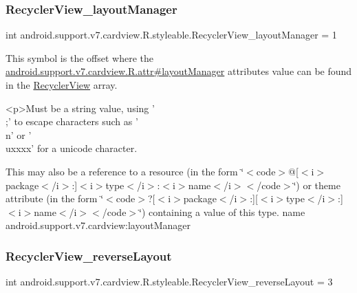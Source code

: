 \subsubsection{\texorpdfstring{Recycler\+View\+\_\+layout\+Manager}{RecyclerView\_layoutManager}}
{\footnotesize\ttfamily int android.\+support.\+v7.\+cardview.\+R.\+styleable.\+Recycler\+View\+\_\+layout\+Manager = 1\hspace{0.3cm}{\ttfamily [static]}}

This symbol is the offset where the \hyperlink{classandroid_1_1support_1_1v7_1_1cardview_1_1R_1_1attr_a7c0556c8a91bf157017e4ec44e5126ab}{android.\+support.\+v7.\+cardview.\+R.\+attr\#layout\+Manager} attribute\textquotesingle{}s value can be found in the \hyperlink{classandroid_1_1support_1_1v7_1_1cardview_1_1R_1_1styleable_a65f321ce206d51d7c6ea76d7ea7bbb05}{Recycler\+View} array.

\begin{DoxyVerb}      <p>Must be a string value, using '\\;' to escape characters such as '\\n' or '\\uxxxx' for a unicode character.
\end{DoxyVerb}
 

This may also be a reference to a resource (in the form \char`\"{}$<$code$>$@\mbox{[}$<$i$>$package$<$/i$>$\+:\mbox{]}$<$i$>$type$<$/i$>$\+:$<$i$>$name$<$/i$>$$<$/code$>$\char`\"{}) or theme attribute (in the form \char`\"{}$<$code$>$?\mbox{[}$<$i$>$package$<$/i$>$\+:\mbox{]}\mbox{[}$<$i$>$type$<$/i$>$\+:\mbox{]}$<$i$>$name$<$/i$>$$<$/code$>$\char`\"{}) containing a value of this type.  name android.\+support.\+v7.\+cardview\+:layout\+Manager \mbox{\label{classandroid_1_1support_1_1v7_1_1cardview_1_1R_1_1styleable_a2aaa2e04e8a3bb8b0988102a9ec55404}} 
\subsubsection{\texorpdfstring{Recycler\+View\+\_\+reverse\+Layout}{RecyclerView\_reverseLayout}}
{\footnotesize\ttfamily int android.\+support.\+v7.\+cardview.\+R.\+styleable.\+Recycler\+View\+\_\+reverse\+Layout = 3\hspace{0.3cm}{\ttfamily [static]}}

